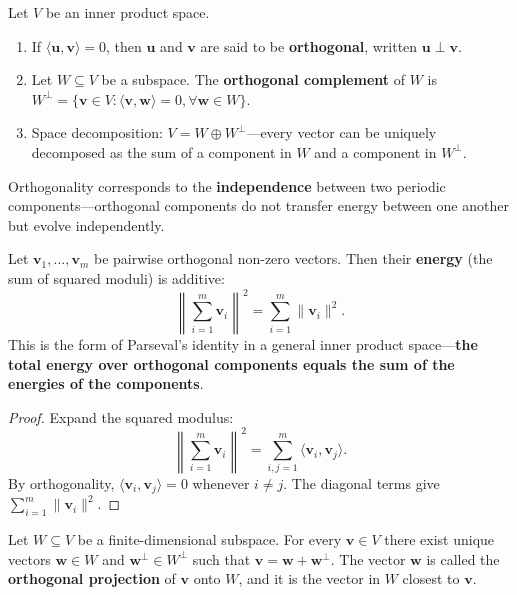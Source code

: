 \begin{definition}\label{def:orthogonal_complement}
Let $V$ be an inner product space.
\begin{enumerate}[label=(\roman*)]
    \item If $\langle \mathbf{u}, \mathbf{v} \rangle = 0$, then $\mathbf{u}$ and $\mathbf{v}$ are said to be \textbf{orthogonal}, written $\mathbf{u} \perp \mathbf{v}$.
    \item Let $W \subseteq V$ be a subspace. The \textbf{orthogonal complement} of $W$ is $W^\perp = \{\mathbf{v} \in V : \langle \mathbf{v}, \mathbf{w} \rangle = 0, \forall \mathbf{w} \in W\}$.
    \item Space decomposition: $V = W \oplus W^\perp$---every vector can be uniquely decomposed as the sum of a component in $W$ and a component in $W^\perp$.
\end{enumerate}

Orthogonality corresponds to the \textbf{independence} between two periodic components---orthogonal components do not transfer energy between one another but evolve independently.
\end{definition}

\begin{proposition}\label{prop:orthogonality_conservation}
Let $\mathbf{v}_1, \dots, \mathbf{v}_m$ be pairwise orthogonal non-zero vectors. Then their \textbf{energy} (the sum of squared moduli) is additive:
\[
\left\| \sum_{i=1}^m \mathbf{v}_i \right\|^2 = \sum_{i=1}^m \|\mathbf{v}_i\|^2.
\]
This is the form of Parseval's identity in a general inner product space---\textbf{the total energy over orthogonal components equals the sum of the energies of the components}.
\end{proposition}

\begin{proof}
Expand the squared modulus:
\[
\left\| \sum_{i=1}^m \mathbf{v}_i \right\|^2 = \sum_{i,j=1}^m \langle \mathbf{v}_i, \mathbf{v}_j \rangle.
\]
By orthogonality, $\langle \mathbf{v}_i, \mathbf{v}_j \rangle = 0$ whenever $i \neq j$. The diagonal terms give $\sum_{i=1}^m \|\mathbf{v}_i\|^2$.
\end{proof}

\begin{proposition}\label{prop:orthogonal_projection}
Let $W \subseteq V$ be a finite-dimensional subspace. For every $\mathbf{v} \in V$ there exist unique vectors $\mathbf{w} \in W$ and $\mathbf{w}^\perp \in W^\perp$ such that $\mathbf{v} = \mathbf{w} + \mathbf{w}^\perp$. The vector $\mathbf{w}$ is called the \textbf{orthogonal projection} of $\mathbf{v}$ onto $W$, and it is the vector in $W$ closest to $\mathbf{v}$.
\end{proposition}

